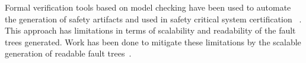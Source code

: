 Formal verification tools based on model checking have been used to automate the generation of safety artifacts and used in safety critical system certification~\cite{Bozzano:2011:SDP:1992983.1992988, symbAltaRica,10.1007/978-3-540-75596-8-13, DBLP:conf/tacas/BittnerBCCGGMMZ16, Bozzano:2010:DSA:1951720} . This approach has limitations in terms of scalability and readability of the fault trees generated. Work has been done to mitigate these limitations by the scalable generation of readable fault trees~\cite{10.1007/978-3-319-11936-6-7}. 


